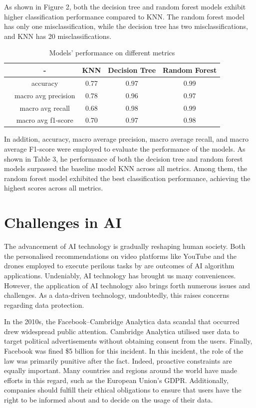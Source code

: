 \documentclass[a4paper,11pt]{article}
\begin{document}
\noindent
As shown in Figure 2, both the decision tree and random forest models exhibit higher classification performance compared to KNN. 
The random forest model has only one misclassification, while the decision tree has two misclassifications, and KNN has 20 misclassifications.

\begin{table}[htbp]
	\centering
	\caption{Models' performance on different metrics}
	\begin{tabular}{lcccc}
		\toprule
		&-& KNN & Decision Tree & Random Forest\\
		\midrule
		& accuracy & 0.77 & 0.97 & 0.99\\
        & macro avg precision & 0.78 & 0.96 & 0.97\\
        & macro avg recall & 0.68 & 0.98& 0.99\\
        & macro avg f1-score& 0.70& 0.97& 0.98\\
		\bottomrule
	\end{tabular}
\end{table}

\noindent
In addition, accuracy, macro average precision, macro average recall, and macro average F1-score were employed to evaluate the performance of the models.
As shown in Table 3, he performance of both the decision tree and random forest models surpassed the baseline model KNN across all metrics. Among them, the random forest model exhibited the best classification performance, achieving the highest scores across all metrics.







\section{Challenges in AI}
The advancement of AI technology is gradually reshaping human society. Both the personalised recommendations on video platforms like YouTube 
and the drones employed to execute perilous tasks by are outcomes of AI algorithm applications. Undeniably, AI technology has brought us many conveniences.
However, the application of AI technology also brings forth numerous issues and challenges. As a data-driven technology, undoubtedly, this 
raises concerns regarding data protection.

\noindent
In the 2010s, the Facebook–Cambridge Analytica data scandal that occurred drew widespread public attention. 
Cambridge Analytica utilised user data to target political advertisements without obtaining consent from the users. Finally, Facebook was fined \$5 billion for this incident.
In this incident, the role of the law was primarily punitive after the fact. Indeed, proactive constraints are equally important. Many countries and 
regions around the world have made efforts in this regard, such as the European Union's GDPR. Additionally, companies should fulfill their 
ethical obligations to ensure that users have the right to be informed about and to decide on the usage of their data.
\end{document}
